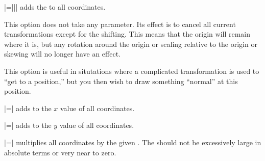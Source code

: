 \begin{itemize}
  |={||}|
  adds the   to all coordinates.
\begin{codeexample}[]
\end{codeexample}

  This option does not take any parameter. Its effect is to cancel all
  current transformations except for the shifting. This means that the
  origin will remain where it is, but any rotation around the origin
  or scaling relative to the origin or skewing will no longer have an
  effect.

  This option is useful in situtations where a complicated
  transformation is used to ``get to a position,'' but you then wish
  to draw something ``normal'' at this position. 

\begin{codeexample}[]
\end{codeexample}

  |=|
  adds  to the $x$ value of all coordinates.  
\begin{codeexample}[]
\end{codeexample}

  |=|
  adds  to the $y$ value of all coordinates.
  
  |=|
  multiplies all coordinates by the given . The
   should not be excessively large in absolute terms or
  very near to zero.
\begin{codeexample}[]
\end{codeexample}


\end{itemize}
